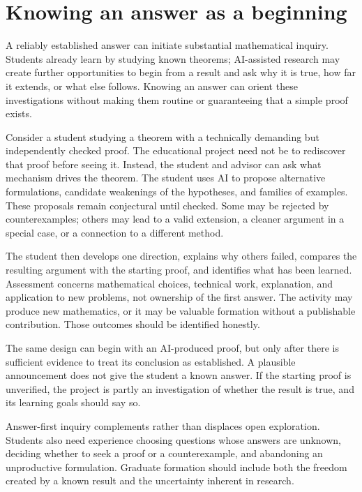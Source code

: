 \documentclass[11pt]{article}
\begin{document}
\section{Knowing an answer as a beginning}
\label{sec:answer-first}

A reliably established answer can initiate substantial mathematical inquiry. Students
already learn by studying known theorems; AI-assisted research may create further
opportunities to begin from a result and ask why it is true, how far it extends, or what
else follows. Knowing an answer can orient these investigations without making them
routine or guaranteeing that a simple proof exists.

Consider a student studying a theorem with a technically demanding but independently
checked proof. The educational project need not be to rediscover that proof before
seeing it. Instead, the student and advisor can ask what mechanism drives the theorem.
The student uses AI to propose alternative formulations, candidate weakenings of the
hypotheses, and families of examples. These proposals remain conjectural until checked.
Some may be rejected by counterexamples; others may lead to a valid extension, a
cleaner argument in a special case, or a connection to a different method.

The student then develops one direction, explains why others failed, compares the
resulting argument with the starting proof, and identifies what has been learned.
Assessment concerns mathematical choices, technical work, explanation, and application
to new problems,
not ownership of the first answer. The activity may produce new mathematics, or it may
be valuable formation without a publishable contribution. Those outcomes should be
identified honestly.

The same design can begin with an AI-produced proof, but only after there is sufficient
evidence to treat its conclusion as established. A plausible announcement does not give
the student a known answer. If the starting proof is unverified, the project is partly
an investigation of whether the result is true, and its learning goals should say so.

Answer-first inquiry complements rather than displaces open exploration. Students also
need experience choosing questions whose answers are unknown, deciding whether to seek
a proof or a counterexample, and abandoning an unproductive formulation. Graduate
formation should include both the freedom created by a known result and the uncertainty
inherent in research.
\end{document}
